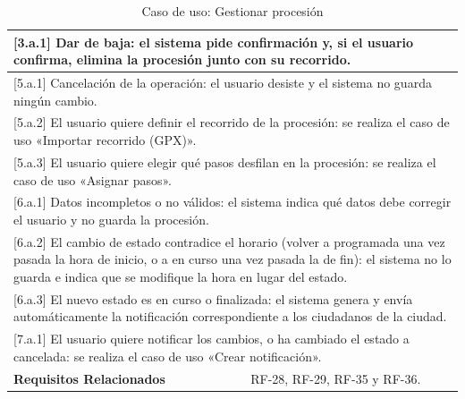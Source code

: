 \begin{table}[h!]
\begin{tabular}{|p{4cm}|p{11cm}|}
        \hline
        \multicolumn{2}{|p{15cm}|}{ [3.a.1] Dar de baja: el sistema pide confirmación y, si el usuario confirma, elimina la procesión junto con su recorrido. } \\
        \hline
        \multicolumn{2}{|p{15cm}|}{ [5.a.1] Cancelación de la operación: el usuario desiste y el sistema no guarda ningún cambio. } \\
        \hline
        \multicolumn{2}{|p{15cm}|}{ [5.a.2] El usuario quiere definir el recorrido de la procesión: se realiza el caso de uso «Importar recorrido (GPX)». } \\
        \hline
        \multicolumn{2}{|p{15cm}|}{ [5.a.3] El usuario quiere elegir qué pasos desfilan en la procesión: se realiza el caso de uso «Asignar pasos». } \\
        \hline
        \multicolumn{2}{|p{15cm}|}{ [6.a.1] Datos incompletos o no válidos: el sistema indica qué datos debe corregir el usuario y no guarda la procesión. } \\
        \hline
        \multicolumn{2}{|p{15cm}|}{ [6.a.2] El cambio de estado contradice el horario (volver a programada una vez pasada la hora de inicio, o a en curso una vez pasada la de fin): el sistema no lo guarda e indica que se modifique la hora en lugar del estado. } \\
        \hline
        \multicolumn{2}{|p{15cm}|}{ [6.a.3] El nuevo estado es en curso o finalizada: el sistema genera y envía automáticamente la notificación correspondiente a los ciudadanos de la ciudad. } \\
        \hline
        \multicolumn{2}{|p{15cm}|}{ [7.a.1] El usuario quiere notificar los cambios, o ha cambiado el estado a cancelada: se realiza el caso de uso «Crear notificación». } \\
        \hline
        \textbf{Requisitos Relacionados} & RF-28, RF-29, RF-35 y RF-36. \\
        \hline
    \end{tabular}
    \caption{Caso de uso: Gestionar procesión}
\end{table}

